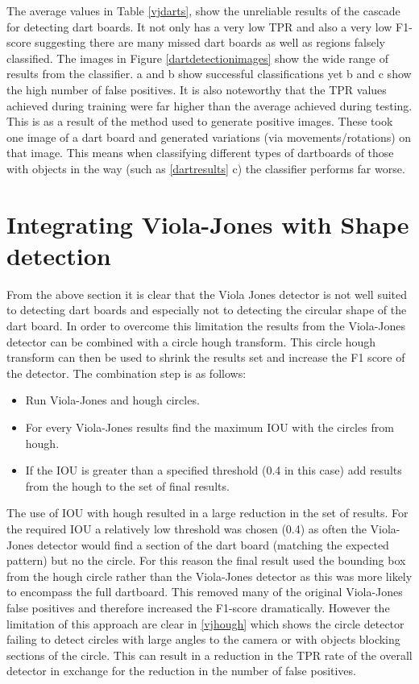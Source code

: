 \documentclass{article}
\begin{document}
\begin{multicols}{2}
The average values in Table \ref{vjdarts}, show the unreliable results of
the cascade for detecting dart boards.  It not only has a very low TPR and also
a very low F1-score suggesting there are many missed dart boards as well as
regions falsely classified. The images in Figure \ref{dartdetectionimages} show
the wide range of results from the classifier. a and b show successful
classifications yet b and c show the high number of false positives. It is also
noteworthy that the TPR values achieved during training were far higher than
the average achieved during testing. This is as a result of the method used to
generate positive images. These took one image of a dart board and generated
variations (via movements/rotations) on that image. This means when classifying
different types of dartboards of those with objects in the way (such as
\ref{dartresults} c) the classifier performs far worse.

\section{Integrating Viola-Jones with Shape detection}

From the above section it is clear that the Viola Jones detector is not well
suited to detecting dart boards and especially not to detecting the circular
shape of the dart board. In order to overcome this limitation the results from
the Viola-Jones detector can be combined with a circle hough transform. This
circle hough transform can then be used to shrink the results set and increase
the F1 score of the detector. The combination step is as follows:

\begin{itemize}
  \item Run Viola-Jones and hough circles.
  \item For every Viola-Jones results find the maximum IOU with the circles
    from hough. 
  \item If the IOU is greater than a specified threshold (0.4 in this case)
    add results from the hough to the set of final results. 
\end{itemize} 

The use of IOU with hough resulted in a large reduction in the set of results.
For the required IOU a relatively low threshold was chosen (0.4) as often the
Viola-Jones detector would find a section of the dart board (matching the
expected pattern) but no the circle. For this reason the final result used the
bounding box from the hough circle rather than the Viola-Jones detector as this
was more likely to encompass the full dartboard. This removed many of the
original Viola-Jones false positives and therefore increased the F1-score
dramatically.  However the limitation of this approach are clear in
\ref{vjhough} which shows the circle detector failing to detect circles with
large angles to the camera or with objects blocking sections of the circle.
This can result in a reduction in the TPR rate of the overall detector in
exchange for the reduction in the number of false positives.


\end{multicols}
\end{document}
